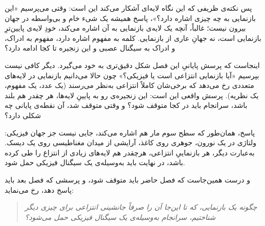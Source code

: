 پس نکته‌ی ظریفی که این نگاه لایه‌ای آشکار می‌کند این است: وقتی می‌پرسیم «این بازنمایی به چه چیزی اشاره دارد؟»، پاسخ همیشه یک شیء خام و بی‌واسطه در جهان بیرون نیست؛ غالباً، آنچه یک لایه‌ی بازنمایی به آن اشاره می‌کند، خودِ لایه‌ی پایین‌ترِ بازنمایی است، نه جهانِ عاری از بازنمایی. کلمه به مفهوم اشاره دارد، مفهوم به ادراک، و ادراک به سیگنال عصبی و این زنجیره تا کجا ادامه دارد؟

اینجاست که پرسش پایانیِ این فصل شکل دقیق‌تری به خود می‌گیرد. دیگر کافی نیست بپرسیم «آیا بازنمایی انتزاعی است یا فیزیکی؟» چون حالا می‌دانیم بازنمایی در لایه‌های متعددی رخ می‌دهد که برخی‌شان کاملاً انتزاعی به‌نظر می‌رسند (یک عدد، یک مفهوم، یک نظریه). پرسش واقعی این است: این زنجیره‌ی رو به پایینِ لایه‌ها، هر چقدر هم بلند باشد، سرانجام باید در کجا متوقف شود؟ و وقتی متوقف شد، آن نقطه‌ی پایانی چه شکلی دارد؟

پاسخ، همان‌طور که سطح سوم مار هم اشاره می‌کند، جایی نیست جز جهان فیزیکی: ولتاژی در یک نورون، جوهری روی کاغذ، آرایشی از میدان مغناطیسی روی یک دیسک. به‌عبارت دیگر، هر بازنماییِ انتزاعی، هرچقدر هم لایه‌های زیادی از انتزاع را طی کرده باشد، در نهایت باید به‌وسیله‌ی یک سیگنال فیزیکی حمل شود.

و درست همین‌جاست که فصل حاضر باید متوقف شود، و پرسشی که فصل بعد باید پاسخ دهد، رخ می‌نماید:

\begin{quote}
\itshape
چگونه یک بازنمایی، که تا این‌جا آن را صرفاً جانشینی انتزاعی برای چیزی دیگر شناختیم، سرانجام به‌وسیله‌ی یک سیگنال فیزیکی حمل می‌شود؟
\end{quote}